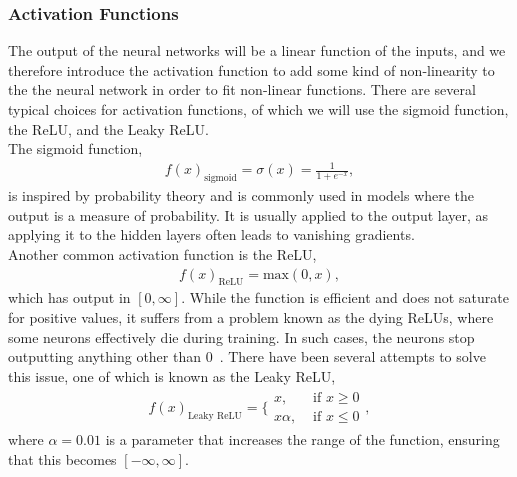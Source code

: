 \documentclass[english,notitlepage,reprint,nofootinbib]{revtex4-2}  %
\begin{document}
\subsubsection*{Activation Functions}%
The output of the neural networks will be a linear function of the inputs, and we therefore introduce the activation function to add some kind of non-linearity to the the neural network in order to fit non-linear functions. 
There are several typical choices for activation functions, of which we will use the sigmoid function, the ReLU, and the Leaky ReLU. 
\vspace{3mm}
\\ 
The sigmoid function, 
\begin{align}
    f(x)_\text{sigmoid} = \sigma(x) = \frac{1}{1+e^{−x}},
\end{align}
is inspired by probability theory and is commonly used in models where the output is a measure of probability. It is usually applied to the output layer, as applying it to the hidden layers often leads to vanishing gradients. 
\vspace{3mm}
\\ 
Another common activation function is the ReLU, 
\begin{align}
    f(x)_\text{ReLU} = \text{max}(0, x), 
\end{align}
which has output in $[0,\infty]$. 
While the function is efficient and does not saturate for positive values, it suffers from a problem known as the dying ReLUs, where some neurons effectively die during training. In such cases, the neurons stop outputting anything other than 0~\cite{lecture_notes}. There have been several attempts to solve this issue, one of which is known as the Leaky ReLU, 
\begin{align}
    f(x)_\text{Leaky ReLU} = \bigg\{ 
    \begin{matrix}
        x,       & \text{ if } x \geq 0 \\ 
        x\alpha, & \text{ if } x \leq 0 
    \end{matrix}, 
\end{align}
where $\alpha=0.01$ is a parameter that increases the range of the function, ensuring that this becomes $[-\infty, \infty]$. 
\end{document}
